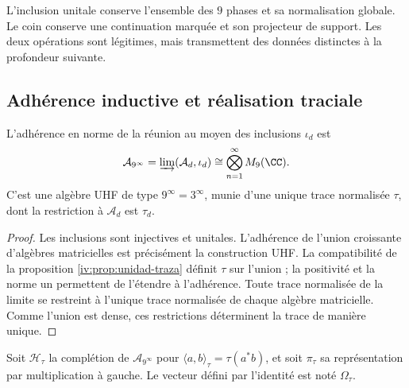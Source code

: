 L’inclusion unitale conserve l’ensemble des \(9\) phases et sa
normalisation globale. Le coin conserve une continuation marquée et
son projecteur de support. Les deux opérations sont légitimes, mais
transmettent des données distinctes à la profondeur suivante.

\subsection{Adhérence inductive et réalisation traciale}

\begin{theorem}
\label{iv:thm:uhf}
L'adhérence en norme de la réunion au moyen des inclusions \(\iota_d\) est
\[
 \mathcal A_{9^\infty}
 =\varinjlim(\mathcal A_d,\iota_d)
 \cong\bigotimes_{n=1}^{\infty}M_9(\CC).
\]
C'est une algèbre UHF de type \(9^\infty=3^\infty\), munie d'une unique trace normalisée \(\tau\), dont la restriction à \(\mathcal A_d\) est \(\tau_d\).
\end{theorem}
\begin{proof}
Les inclusions sont injectives et unitales. L’adhérence de l’union
croissante d’algèbres matricielles est précisément la construction UHF.
La compatibilité de la proposition \ref{iv:prop:unidad-traza}
définit \(\tau\) sur l’union ; la positivité et la norme un permettent
de l’étendre à l’adhérence. Toute trace normalisée de la limite se restreint
à l’unique trace normalisée de chaque algèbre matricielle. Comme l’union
est dense, ces restrictions déterminent la trace de manière unique.
\end{proof}

Soit \(\mathcal H_\tau\) la complétion de
\(\mathcal A_{9^\infty}\) pour
\(\langle a,b\rangle_\tau=\tau(a^*b)\), et soit \(\pi_\tau\)
sa représentation par multiplication à gauche. Le vecteur défini
par l’identité est noté \(\Omega_\tau\).


